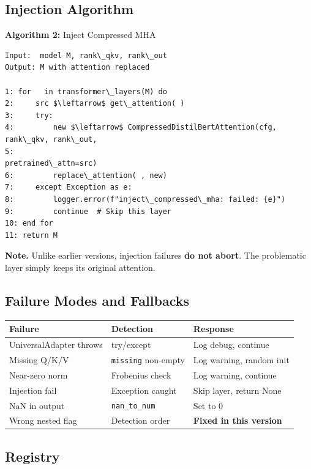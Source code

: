 \subsection{Injection Algorithm}

\textbf{Algorithm 2:} Inject Compressed MHA
\begin{lstlisting}
Input:  model M, rank\_qkv, rank\_out
Output: M with attention replaced

1: for   in transformer\_layers(M) do
2:     src $\leftarrow$ get\_attention( )
3:     try:
4:         new $\leftarrow$ CompressedDistilBertAttention(cfg, rank\_qkv, rank\_out, 
5:                                                pretrained\_attn=src)
6:         replace\_attention( , new)
7:     except Exception as e:
8:         logger.error(f"inject\_compressed\_mha: failed: {e}")
9:         continue  # Skip this layer
10: end for
11: return M
\end{lstlisting}

\textbf{Note.} Unlike earlier versions, injection failures \textbf{do not abort}. 
The problematic layer simply keeps its original attention.

\subsection{Failure Modes and Fallbacks}

\begin{table}[H]
\centering
\small
\begin{tabular}{lll}
\toprule
\textbf{Failure} & \textbf{Detection} & \textbf{Response} \\
\midrule
UniversalAdapter throws & try/except & Log debug, continue \\
Missing Q/K/V & \texttt{missing} non-empty & Log warning, random init \\
Near-zero norm & Frobenius check & Log warning, continue \\
Injection fail & Exception caught & Skip layer, return None \\
NaN in output & \texttt{nan\_to\_num} & Set to 0 \\
Wrong nested flag & Detection order & \textbf{Fixed in this version} \\
\bottomrule
\end{tabular}
\end{table}

\subsection{Registry}

